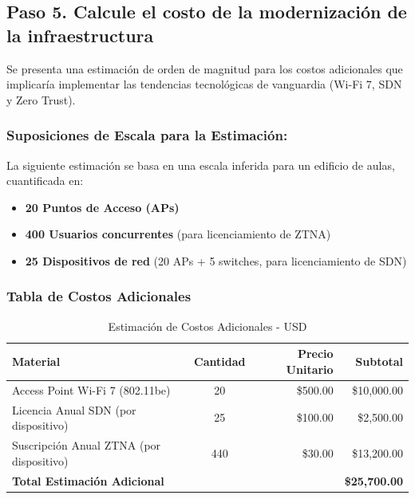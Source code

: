 \subsection*{Paso 5. Calcule el costo de la modernización de la infraestructura}

Se presenta una estimación de orden de magnitud para los costos adicionales que implicaría implementar las tendencias tecnológicas de vanguardia (Wi-Fi 7, SDN y Zero Trust).

\subsubsection*{Suposiciones de Escala para la Estimación:}

La siguiente estimación se basa en una escala inferida para un edificio de aulas, cuantificada en:
\begin{itemize}
\item \textbf{20 Puntos de Acceso (APs)}
\item \textbf{400 Usuarios concurrentes} (para licenciamiento de ZTNA)
\item \textbf{25 Dispositivos de red} (20 APs + 5 switches, para licenciamiento de SDN)
\end{itemize}

\subsubsection*{Tabla de Costos Adicionales}

\begin{table}[htbp]
\centering
\caption{Estimación de Costos Adicionales - USD}
\label{tab:costos_rom}
\begin{tabular}{l c r r}
\toprule
\textbf{Material} & \textbf{Cantidad} & \textbf{Precio Unitario} & \textbf{Subtotal} \\
\midrule
Access Point Wi-Fi 7 (802.11be) & 20 & \$500.00 & \$10,000.00 \\
Licencia Anual SDN (por dispositivo) & 25 & \$100.00 & \$2,500.00 \\
Suscripción Anual ZTNA (por dispositivo) & 440 & \$30.00 & \$13,200.00 \\
\midrule
\textbf{Total Estimación Adicional} & & & \textbf{\$25,700.00} \\
\bottomrule
\end{tabular}
\end{table}

